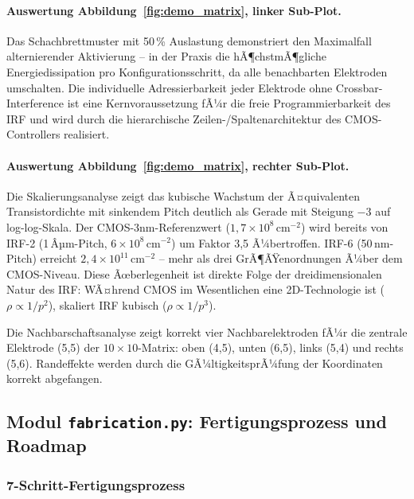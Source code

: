 ﻿\documentclass[a4paper,12pt]{scrreprt}
\theoremstyle{definition}
\begin{document}
\paragraph{Auswertung Abbildung~\ref{fig:demo_matrix}, linker Sub-Plot.}
Das Schachbrettmuster mit 50\,\% Auslastung demonstriert den Maximalfall
alternierender Aktivierung -- in der Praxis die hÃ¶chstmÃ¶gliche Energiedissipation
pro Konfigurationsschritt, da alle benachbarten Elektroden umschalten.
Die individuelle Adressierbarkeit jeder Elektrode ohne Crossbar-Interference
ist eine Kernvoraussetzung fÃ¼r die freie Programmierbarkeit des IRF und wird
durch die hierarchische Zeilen-/Spaltenarchitektur des CMOS-Controllers realisiert.

\paragraph{Auswertung Abbildung~\ref{fig:demo_matrix}, rechter Sub-Plot.}
Die Skalierungsanalyse zeigt das kubische Wachstum der Ã¤quivalenten Transistordichte
mit sinkendem Pitch deutlich als Gerade mit Steigung $-3$ auf log-log-Skala.
Der CMOS-3nm-Referenzwert ($1{,}7 \times 10^8$\,cm$^{-2}$) wird bereits von
IRF-2 (1\,Âµm-Pitch, $6 \times 10^8$\,cm$^{-2}$) um Faktor 3,5 Ã¼bertroffen.
IRF-6 (50\,nm-Pitch) erreicht $2{,}4 \times 10^{11}$\,cm$^{-2}$ -- mehr als
drei GrÃ¶ÃŸenordnungen Ã¼ber dem CMOS-Niveau. Diese Ãœberlegenheit ist direkte
Folge der dreidimensionalen Natur des IRF: WÃ¤hrend CMOS im Wesentlichen eine
2D-Technologie ist ($\rho \propto 1/p^2$), skaliert IRF kubisch ($\rho \propto 1/p^3$).

Die Nachbarschaftsanalyse zeigt korrekt vier Nachbarelektroden fÃ¼r
die zentrale Elektrode (5,5) der $10 \times 10$-Matrix: oben (4,5),
unten (6,5), links (5,4) und rechts (5,6). Randeffekte werden durch
die GÃ¼ltigkeitsprÃ¼fung der Koordinaten korrekt abgefangen.

\subsection{Modul \texttt{fabrication.py}: Fertigungsprozess und Roadmap}
\label{subsec:demo_fabrication}

\subsubsection{7-Schritt-Fertigungsprozess}
\end{document}
